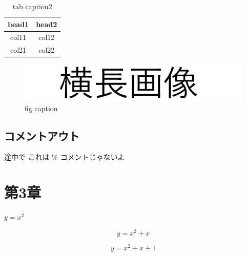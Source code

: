 \documentclass[a4paper,11pt]{jarticle}
\begin{document}
        \begin{table}[h]
            \caption{tab caption2}
            \begin{tabular}{cc} \toprule
                head1 & head2 \\\midrule
                col11 & col12 \\
                col21 & col22 \\\bottomrule
            \end{tabular}
            \label{tab:table2}
        \end{table}

        \begin{figure}[h]
            \centering
            \includegraphics{zzz.png}
            \caption{fig caption}
            \label{fig:figure}
        \end{figure}

        \subsection*{コメントアウト}
            途中で %
            これは \% コメントじゃないよ

    \section{第3章}
        $y = x^2$

        $$y = x^2 + x$$

        \[y = x^2 + x + 1\]
\end{document}

